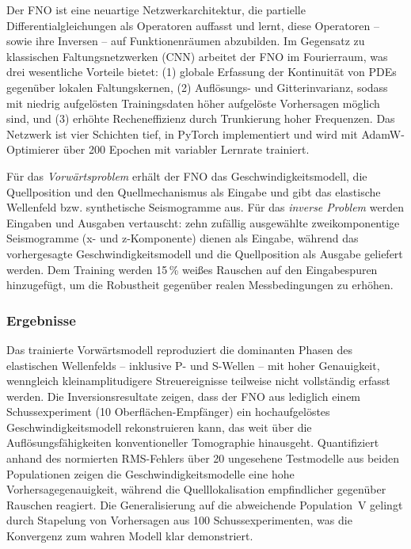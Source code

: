 \documentclass[a4paper,12pt]{article}
\begin{document}
Der FNO ist eine neuartige Netzwerkarchitektur, die partielle Differentialgleichungen als Operatoren 
auffasst und lernt, diese Operatoren -- sowie ihre Inversen -- auf Funktionenräumen abzubilden. 
Im Gegensatz zu klassischen Faltungsnetzwerken (CNN) arbeitet der FNO im Fourierraum, was 
drei wesentliche Vorteile bietet: (1) globale Erfassung der Kontinuität von PDEs gegenüber 
lokalen Faltungskernen, (2) Auflösungs- und Gitterinvarianz, sodass mit niedrig aufgelösten 
Trainingsdaten höher aufgelöste Vorhersagen möglich sind, und (3) erhöhte Recheneffizienz 
durch Trunkierung hoher Frequenzen. Das Netzwerk ist vier Schichten tief, in PyTorch implementiert 
und wird mit AdamW-Optimierer über 200 Epochen mit variabler Lernrate trainiert.

Für das \textit{Vorwärtsproblem} erhält der FNO das Geschwindigkeitsmodell, die Quellposition 
und den Quellmechanismus als Eingabe und gibt das elastische Wellenfeld bzw. synthetische 
Seismogramme aus. Für das \textit{inverse Problem} werden Eingaben und Ausgaben vertauscht: 
zehn zufällig ausgewählte zweikomponentige Seismogramme (x- und z-Komponente) dienen als 
Eingabe, während das vorhergesagte Geschwindigkeitsmodell und die Quellposition als Ausgabe 
geliefert werden. Dem Training werden 15\,\% weißes Rauschen auf den Eingabespuren hinzugefügt, 
um die Robustheit gegenüber realen Messbedingungen zu erhöhen.

\subsubsection*{Ergebnisse}

Das trainierte Vorwärtsmodell reproduziert die dominanten Phasen des elastischen Wellenfelds -- 
inklusive P- und S-Wellen -- mit hoher Genauigkeit, wenngleich kleinamplitudigere 
Streuereignisse teilweise nicht vollständig erfasst werden. Die Inversionsresultate zeigen, 
dass der FNO aus lediglich einem Schussexperiment (10 Oberflächen-Empfänger) ein 
hochaufgelöstes Geschwindigkeitsmodell rekonstruieren kann, das weit über die 
Auflösungsfähigkeiten konventioneller Tomographie hinausgeht. Quantifiziert anhand des 
normierten RMS-Fehlers über 20 ungesehene Testmodelle aus beiden Populationen zeigen die 
Geschwindigkeitsmodelle eine hohe Vorhersagegenauigkeit, während die Quelllokalisation 
empfindlicher gegenüber Rauschen reagiert. Die Generalisierung auf die abweichende 
Population~V gelingt durch Stapelung von Vorhersagen aus 100 Schussexperimenten, was 
die Konvergenz zum wahren Modell klar demonstriert.
\end{document}
